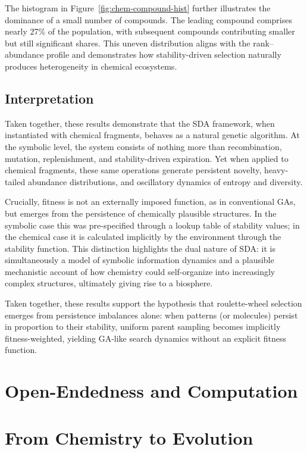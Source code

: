 \documentclass[life,article,submit,pdftex,moreauthors]{Definitions/mdpi}
\begin{document}
The histogram in Figure~\ref{fig:chem-compound-hist} further illustrates the dominance of a small number of compounds. The leading compound comprises nearly 27\% of the population, with subsequent compounds contributing smaller but still significant shares. This uneven distribution aligns with the rank–abundance profile and demonstrates how stability-driven selection naturally produces heterogeneity in chemical ecosystems.  

\subsection{Interpretation}

Taken together, these results demonstrate that the SDA framework, when instantiated with chemical fragments, behaves as a natural genetic algorithm. At the symbolic level, the system consists of nothing more than recombination, mutation, replenishment, and stability-driven expiration. Yet when applied to chemical fragments, these same operations generate persistent novelty, heavy-tailed abundance distributions, and oscillatory dynamics of entropy and diversity.  

Crucially, fitness is not an externally imposed function, as in conventional GAs, but emerges from the persistence of chemically plausible structures. In the symbolic case this was pre-specified through a lookup table of stability values; in the chemical case it is calculated implicitly by the environment through the stability function. This distinction highlights the dual nature of SDA: it is simultaneously a model of symbolic information dynamics and a plausible mechanistic account of how chemistry could self-organize into increasingly complex structures, ultimately giving rise to a biosphere.  

Taken together, these results support the hypothesis that roulette-wheel selection emerges from persistence imbalances alone: when patterns (or molecules) persist in proportion to their stability, uniform parent sampling becomes implicitly fitness-weighted, yielding GA-like search dynamics without an explicit fitness function.

\section{Open-Endedness and Computation}

\section{From Chemistry to Evolution}
\end{document}
